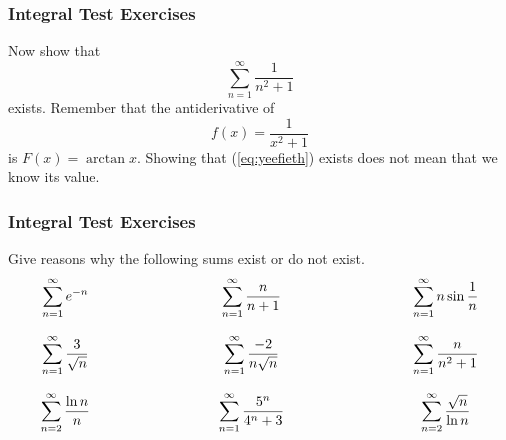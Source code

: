 \documentclass[xcolor=dvipsnames]{beamer}
\begin{document}
\begin{frame}
  \frametitle{Integral Test Exercises}
Now show that
  \begin{equation}
    \label{eq:yeefieth}
    \sum_{n=1}^{\infty}\frac{1}{n^{2}+1}
  \end{equation}
  exists. Remember that the antiderivative of
  \begin{equation}
    \label{eq:jaifahti}
    f(x)=\frac{1}{x^{2}+1}
  \end{equation}
is $F(x)=\arctan{}x$. Showing that (\ref{eq:yeefieth}) exists does not
mean that we know its value.
\end{frame}

\begin{frame}
  \frametitle{Integral Test Exercises}
  Give reasons why the following sums exist or do not exist.
  \begin{equation}
    \label{eq:oosuphif}
    \begin{array}{ccccc}
      \displaystyle \sum_{n=1}^{\infty}e^{-n} & \hspace{1in} & \displaystyle \sum_{n=1}^{\infty}\frac{n}{n+1} & \hspace{1in} & \displaystyle \sum_{n=1}^{\infty}n\sin\frac{1}{n} \\
      & \hspace{1in} & \\
      \displaystyle \sum_{n=1}^{\infty}\frac{3}{\sqrt{n}} & \hspace{1in} & \displaystyle \sum_{n=1}^{\infty}\frac{-2}{n\sqrt{n}} & & \displaystyle \sum_{n=1}^{\infty}\frac{n}{n^{2}+1} \\
      & \hspace{1in} & \\
      \displaystyle \sum_{n=2}^{\infty}\frac{\ln{}n}{n} & \hspace{1in} & \displaystyle \sum_{n=1}^{\infty}\frac{5^{n}}{4^{n}+3} & & \displaystyle \sum_{n=2}^{\infty}\frac{\sqrt{n}}{\ln{}n}\\
    \end{array}\notag
  \end{equation}
\end{frame}
\end{document}
